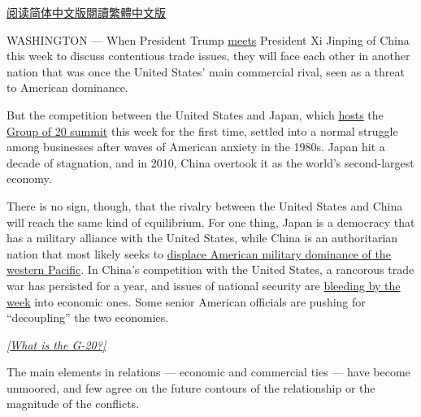\href{https://cn.nytimes3xbfgragh.onion/china/20190627/united-states-china-conflict/}{阅读简体中文版}\href{https://cn.nytimes3xbfgragh.onion/china/20190627/united-states-china-conflict/zh-hant/}{閱讀繁體中文版}

WASHINGTON --- When President Trump
\href{https://www.nytimes3xbfgragh.onion/2019/06/18/us/politics/trump-china-meeting-trade.html}{meets}
President Xi Jinping of China this week to discuss contentious trade
issues, they will face each other in another nation that was once the
United States' main commercial rival, seen as a threat to American
dominance.

But the competition between the United States and Japan, which
\href{https://www.nytimes3xbfgragh.onion/2019/06/25/us/politics/trump-g-20-japan.html?smid=nytcore-ios-share}{hosts}
the
\href{https://www.nytimes3xbfgragh.onion/2019/06/07/business/economy/g20-trade-war-trump-tariffs.html}{Group
of 20 summit} this week for the first time, settled into a normal
struggle among businesses after waves of American anxiety in the 1980s.
Japan hit a decade of stagnation, and in 2010, China overtook it as the
world's second-largest economy.

There is no sign, though, that the rivalry between the United States and
China will reach the same kind of equilibrium. For one thing, Japan is a
democracy that has a military alliance with the United States, while
China is an authoritarian nation that most likely seeks to
\href{https://www.nytimes3xbfgragh.onion/2018/11/14/world/asia/usa-china-trade-pacific.html}{displace
American military dominance of the western Pacific}. In China's
competition with the United States, a rancorous trade war has persisted
for a year, and issues of national security are
\href{https://www.nytimes3xbfgragh.onion/2019/06/08/business/trump-economy-national-security.html}{bleeding
by the week} into economic ones. Some senior American officials are
pushing for ``decoupling'' the two economies.

\emph{\href{https://www.nytimes3xbfgragh.onion/2019/06/27/world/asia/what-is-the-g20.html}{{[}What
is the G-20?{]}}}

The main elements in relations --- economic and commercial ties --- have
become unmoored, and few agree on the future contours of the
relationship or the magnitude of the conflicts.

